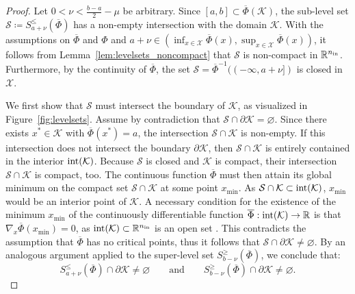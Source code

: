 \documentclass[10pt]{article}
\theoremstyle{definition}
\numberwithin{equation}{section}
\newcommand{\R}{\mathbb{R}}
\begin{document}
\begin{proof}
    Let $0 < \nu < \frac{b-a}{2}-\mu$ be arbitrary. 
    Since $[a,b] \subset \overline{\Phi}(\mathcal{K})$, the sub-level set $\mathcal{S} \coloneqq S_{a+\nu}^{\leq}(\overline{\Phi})$ has a non-empty intersection with the domain $\mathcal{K}$. With the assumptions on $\overline{\Phi}$ and $\Phi$ and $a+\nu\in (\inf_{x \in \mathcal{X}} \overline{\Phi}(x),\sup_{x \in \mathcal{X}} \overline{\Phi}(x))$, it follows from Lemma~\ref{lem:levelsets_noncompact} that $\mathcal{S}$ is non-compact in $\R^{n_{\textup{in}}}$. Furthermore, by the continuity of $\overline{\Phi}$, the set $\mathcal{S} = \overline{\Phi}^{-1}((-\infty,a+\nu])$ is closed in $\mathcal{X}$.
    
    We first show that $\mathcal{S}$ must intersect the boundary of $\mathcal{K}$, as visualized in Figure~\ref{fig:levelsets}. Assume by contradiction that $\mathcal{S} \cap \partial \mathcal{K} = \varnothing$. Since there exists $x^\ast \in \mathcal{K}$ with $\overline{\Phi}(x^\ast) = a$, the intersection $\mathcal{S} \cap \mathcal{K}$ is non-empty. If this intersection does not intersect the boundary $\partial \mathcal{K}$, then $\mathcal{S} \cap \mathcal{K}$ is entirely contained in the interior $\textup{int}(\mathcal{K})$. Because $\mathcal{S}$ is closed and $\mathcal{K}$ is compact, their intersection $\mathcal{S} \cap \mathcal{K}$ is compact, too. The continuous function $\overline{\Phi}$ must then attain its global minimum on the compact set $\mathcal{S} \cap \mathcal{K}$ at some point $x_{\min}$. As $\mathcal{S} \cap \mathcal{K} \subset \textup{int}(\mathcal{K})$,  $x_{\min}$ would be an interior point of $\mathcal{K}$.
    A necessary condition for the existence of the minimum $x_{\min}$ of the continuously differentiable function $\overline{\Phi}: \textup{int}(\mathcal{K}) \rightarrow \R$ is that $\nabla_x\overline{\Phi}(x_{\min}) = 0$, as $\textup{int}(\mathcal{K}) \subset \R^{n_{\textup{in}}}$ is an open set \cite{Forster2017}. This contradicts the assumption that $\overline{\Phi}$ has no critical points, thus it follows that $\mathcal{S} \cap \partial \mathcal{K} \neq \varnothing$.
    By an analogous argument applied to the super-level set $S_{b-\nu}^{\geq}(\overline{\Phi})$, we conclude that:
    \begin{equation} \label{eq:proof_levelsets_1}
        S_{a+\nu}^{\leq}(\overline{\Phi}) \cap \partial \mathcal{K} \neq \varnothing \qquad \text{and} \qquad S_{b-\nu}^{\geq}(\overline{\Phi}) \cap \partial \mathcal{K} \neq \varnothing.
    \end{equation}

\end{proof}
\end{document}
